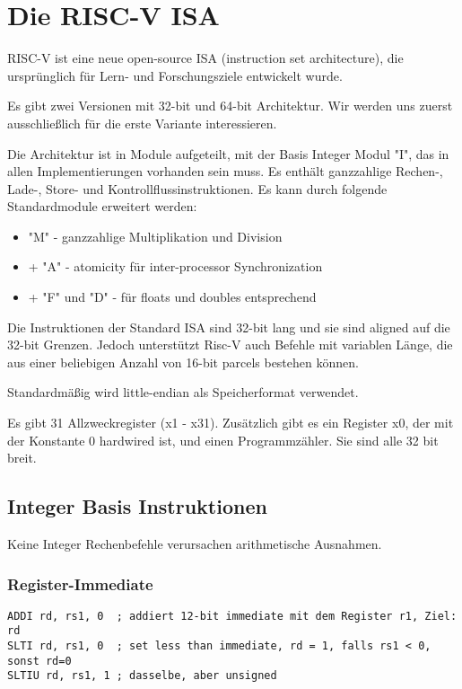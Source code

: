 \section{Die RISC-V ISA}

RISC-V ist eine neue open-source ISA (instruction set architecture), die
ursprünglich für Lern- und Forschungsziele entwickelt wurde.

Es gibt zwei Versionen mit 32-bit und 64-bit Architektur. Wir werden uns
zuerst ausschließlich für die erste Variante interessieren.

Die Architektur ist in Module aufgeteilt, mit der Basis Integer Modul "I",
das in allen Implementierungen vorhanden sein muss. Es enthält ganzzahlige
Rechen-, Lade-, Store- und Kontrollflussinstruktionen. Es kann durch folgende
Standardmodule erweitert werden:

\begin{itemize}
\item "M" - ganzzahlige Multiplikation und Division
\item + "A" - atomicity für inter-processor Synchronization
\item + "F" und "D" - für floats und doubles entsprechend
\end{itemize}

Die Instruktionen der Standard ISA sind 32-bit lang und sie sind aligned auf die
32-bit Grenzen. Jedoch unterstützt Risc-V auch Befehle mit variablen Länge, die
aus einer beliebigen Anzahl von 16-bit parcels bestehen können.

Standardmäßig wird little-endian als Speicherformat verwendet.

Es gibt 31 Allzweckregister (x1 - x31). Zusätzlich gibt es ein Register x0, der
mit der Konstante 0 hardwired ist, und einen Programmzähler. Sie sind alle 32
bit breit.

\subsection{Integer Basis Instruktionen}

Keine Integer Rechenbefehle verursachen arithmetische Ausnahmen.

\subsubsection{Register-Immediate}

\begin{lstlisting}
ADDI rd, rs1, 0  ; addiert 12-bit immediate mit dem Register r1, Ziel: rd
SLTI rd, rs1, 0  ; set less than immediate, rd = 1, falls rs1 < 0, sonst rd=0
SLTIU rd, rs1, 1 ; dasselbe, aber unsigned
\end{lstlisting}

